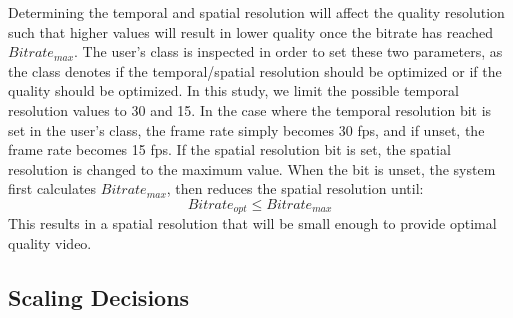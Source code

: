 Determining the temporal and spatial resolution will affect the quality resolution such that higher values will result in lower quality once the bitrate has reached $Bitrate_{max}$. The user's class is inspected in order to set these two parameters, as the class denotes if the temporal/spatial resolution should be optimized or if the quality should be optimized. In this study, we limit the possible temporal resolution values to 30 and 15. In the case where the temporal resolution bit is set in the user’s class, the frame rate simply becomes 30 fps, and if unset, the frame rate becomes 15 fps. If the spatial resolution bit is set, the spatial resolution is changed to the maximum value. When the bit is unset, the system first calculates $Bitrate_{max}$, then reduces the spatial resolution until:
\begin{equation}
\label{equ:OptMaxRelation}
Bitrate_{opt} \le Bitrate_{max}
\end{equation}
This results in a spatial resolution that will be small enough to provide optimal quality video.

\subsection{Scaling Decisions}

